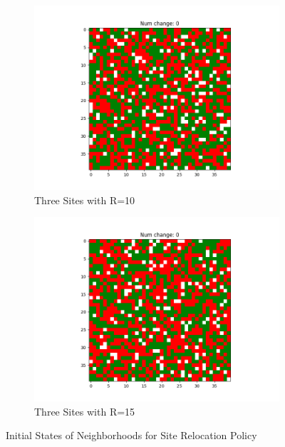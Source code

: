 \documentclass[11pt]{article}
\begin{document}
\begin{figure}[h]
\begin{subfigure}{0.14\textwidth}
			\includegraphics[width=\linewidth]{policy3_initial_h3r10.png}
			\caption{\centering Three Sites with R=10}
		\end{subfigure}\hfill
		\begin{subfigure}{0.14\textwidth}
			\includegraphics[width=\linewidth]{policy3_initial_h3r15.png}
			\caption{\centering Three Sites with R=15}
		\end{subfigure}\hfill
		\caption{Initial States of Neighborhoods for Site Relocation Policy}
	\end{figure}
	\vspace{-2em} %
\end{document}
